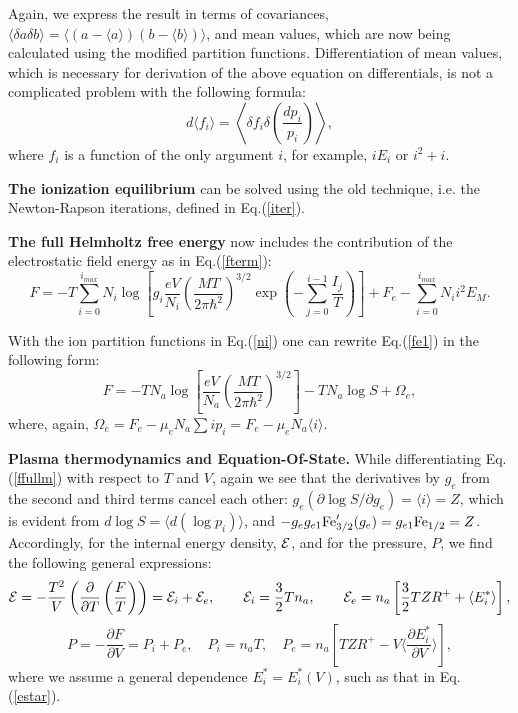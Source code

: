 Again, we express the result in terms of covariances,
$\langle \delta a \delta b \rangle = \langle (a - \langle a \rangle) (b - \langle b \rangle) \rangle$,
and mean values, which are now being calculated
using the modified partition functions.
Differentiation of mean values, which is necessary for derivation of the above equation on
differentials, is not a complicated problem with the following formula:
\begin{equation}
d \langle f_i \rangle = \left\langle \delta f_i \delta\left( \frac{dp_i}{p_i} \right) \right\rangle,
\end{equation}
where $f_i$ is a function of the only argument $i$, for example, $iE_i$ or $i^2+i$.

{\bf The ionization equilibrium} can be solved using the old technique, i.e. the Newton-Rapson
iterations, defined in Eq.(\ref{iter}).

{\bf The full Helmholtz free energy} now includes the contribution of the electrostatic field energy as in Eq.(\ref{fterm}):
\begin{equation}\label{fe1}
F=-T
\sum_{i=0}^{i_{max}}{
N_i\log\left[g_i
  \frac{eV}{N_i}\left(\frac{MT}{2\pi \hbar^2}\right)^{3/2}\exp \left(-\sum_{j=0}^{i-1}\frac{I_j}T \right)\right]}+F_e
  - \sum_{i=0}^{i_{max}} {N_ii^2 E_M}.
\end{equation}  

With the ion partition functions in Eq.(\ref{ni}) one can rewrite Eq.(\ref{fe1}) in the following form:
\begin{equation}\label{ffullm}
F = -TN_a\log\left[\frac{eV}{N_a}\left(\frac{MT}{2\pi \hbar^2}\right)^{3/2}\right]-TN_a\log S + \Omega_e, 
\end{equation}
where, again, $\Omega_e = F_e - \mu_e N_a \sum i p_i = F_e - \mu_e N_a \langle i \rangle $.

{\bf Plasma thermodynamics and Equation-Of-State.} 
While differentiating Eq.(\ref{ffullm}) with respect to $T$ and $V$, again we see that the derivatives
by $g_e$ from the second and third terms cancel 
each other: $g_e(\partial \log S/\partial g_e)=\langle i\rangle=Z$,
which is evident from $d \log S = \langle d (\log p_i) \rangle$,
and $-g_eg_{e1}{\rm Fe}^\prime_{3/2}(g_e)=g_{e1}{\rm Fe}_{1/2}=Z$.
Accordingly, for the internal energy density,
${\cal E}$, and for the pressure, $P$, we find the following general expressions:
\begin{equation}\label{generalE}
{\cal E} = -\frac{T^2}V\left(\frac{\partial}{\partial T}\left(\frac F T\right)\right)=
{\cal E}_i+{\cal E}_e,\qquad{\cal E}_i=\frac32Tn_a,\qquad
{\cal E}_e = n_a\left[ \frac32 T Z R^+ + \langle E^*_i \rangle \right],
\end{equation}
\begin{equation}\label{generalP}
P = -\frac{\partial F}{\partial V}=P_i+P_e,\quad
P_i = n_aT,\quad
P_e = n_a \left[ T ZR^+ - V \langle \frac{\partial E^*_i}{\partial V} \rangle \right],
\end{equation}
where we assume a general dependence $E^*_i=E^*_i(V)$, such as that in Eq.(\ref{estar}).

